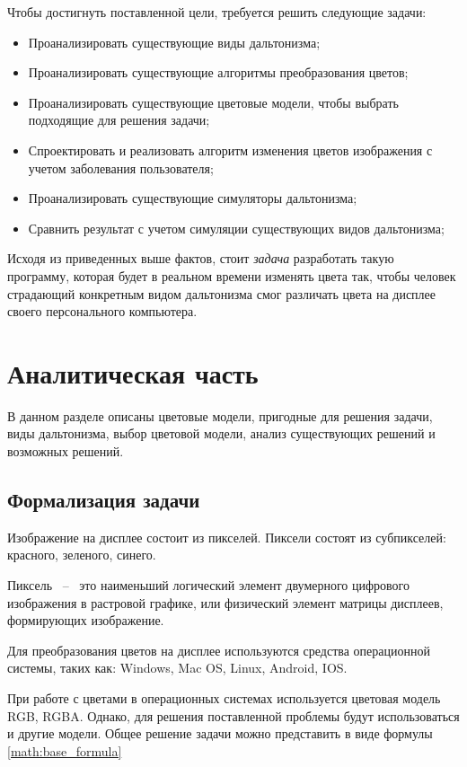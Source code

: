 \documentclass[a4paper,14pt, unknownkeysallowed]{extreport}
\begin{document}
    Чтобы достигнуть поставленной цели, требуется решить следующие задачи:

    \begin{itemize}
        \item Проанализировать существующие виды дальтонизма;
        \item Проанализировать существующие алгоритмы преобразования цветов;
        \item Проанализировать существующие цветовые модели, чтобы выбрать подходящие для решения задачи;
        \item Спроектировать и реализовать алгоритм изменения цветов изображения с учетом заболевания пользователя;
        \item Проанализировать существующие симуляторы дальтонизма;
        \item Сравнить результат с учетом симуляции существующих видов дальтонизма;
    \end{itemize}

    Исходя из приведенных выше фактов, стоит \textit{задача} разработать такую программу, которая будет в реальном времени изменять цвета так, чтобы человек страдающий конкретным видом дальтонизма смог различать цвета на дисплее своего персонального компьютера.

    \pagebreak

    \chapter{Аналитическая часть}
    В данном разделе описаны цветовые модели, пригодные для решения задачи, виды дальтонизма, выбор цветовой модели, анализ существующих решений и возможных решений.

    \section{Формализация задачи}
    
    Изображение на дисплее состоит из пикселей. Пиксели состоят из субпикселей: красного, зеленого, синего. 
    
    Пиксель ~--~ это наименьший логический элемент двумерного цифрового изображения в растровой графике, или физический элемент матрицы дисплеев, формирующих изображение.

    Для преобразования цветов на дисплее используются средства операционной системы, таких как: Windows, Mac OS, Linux, Android, IOS.
    
    При работе с цветами в операционных системах используется цветовая модель RGB, RGBA. Однако, для решения поставленной проблемы будут использоваться и другие модели. Общее решение задачи можно представить в виде формулы \ref{math:base_formula}
\end{document}
